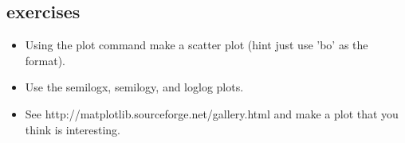 \subsection{exercises}

\begin{frame}
\begin{itemize}
\item Using the plot command make a scatter plot (hint just use 'bo' as the format).
\item Use the semilogx, semilogy, and loglog plots.
\item See http://matplotlib.sourceforge.net/gallery.html and make a plot that you think is interesting.
\end{itemize}
\end{frame}
